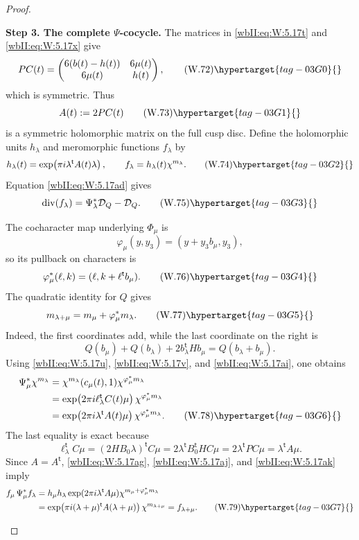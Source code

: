 \begin{proof}
\begin{enumerate}[label={$\langle1\rangle$\arabic*.},leftmargin=*]
\noindent\textbf{Step 3. The complete \(\Psi\)-cocycle.}
The matrices in \eqref{wbII:eq:W:5.17t} and \eqref{wbII:eq:W:5.17x} give
\[
 PC(t)=
 \begin{pmatrix}
 6(b(t)-h(t))&6\mu(t)\\
 6\mu(t)&h(t)
 \end{pmatrix},
\tag{W.72}\hypertarget{tag-03G0}{}\label{wbII:eq:W:5.17ae}
\]
which is symmetric.  Thus
\[
 A(t):=2PC(t)
\tag{W.73}\hypertarget{tag-03G1}{}\label{wbII:eq:W:5.17af}
\]
is a symmetric holomorphic matrix on the full cusp disc.  Define the
holomorphic units \(h_\lambda\) and meromorphic functions \(f_\lambda\) by
\[
 h_\lambda(t)=
 \exp\!\left(\pi i\lambda^{\mathsf t}A(t)\lambda\right),
 \qquad
 f_\lambda=h_\lambda(t)\chi^{m_\lambda}.
\tag{W.74}\hypertarget{tag-03G2}{}\label{wbII:eq:W:5.17ag}
\]
Equation \eqref{wbII:eq:W:5.17ad} gives
\[
 \operatorname{div}(f_\lambda)
 =\Psi_\lambda^*\mathcal D_Q-\mathcal D_Q.
\tag{W.75}\hypertarget{tag-03G3}{}\label{wbII:eq:W:5.17ah}
\]

The cocharacter map underlying \(\Phi_\mu\) is
\[
 \varphi_\mu(y,y_3)=(y+y_3b_\mu,y_3),
\]
so its pullback on characters is
\[
 \varphi_\mu^*(\ell,k)
 =(\ell,k+\ell^{\mathsf t}b_\mu).
\tag{W.76}\hypertarget{tag-03G4}{}\label{wbII:eq:W:5.17ai}
\]
The quadratic identity for \(Q\) gives
\[
 m_{\lambda+\mu}=m_\mu+\varphi_\mu^*m_\lambda.
\tag{W.77}\hypertarget{tag-03G5}{}\label{wbII:eq:W:5.17aj}
\]
Indeed, the first coordinates add, while the last coordinate on the
right is
\[
 Q(b_\mu)+Q(b_\lambda)+2b_\lambda^{\mathsf t}Hb_\mu
 =Q(b_\lambda+b_\mu).
\]
Using \eqref{wbII:eq:W:5.17u}, \eqref{wbII:eq:W:5.17v}, and \eqref{wbII:eq:W:5.17ai}, one obtains
\begin{align*}
 \Psi_\mu^*\chi^{m_\lambda}
 &=\chi^{m_\lambda}(c_\mu(t),1)
   \chi^{\varphi_\mu^*m_\lambda}\\
 &=\exp\!\left(2\pi i\ell_\lambda^{\mathsf t}C(t)\mu\right)
   \chi^{\varphi_\mu^*m_\lambda}\\
 &=\exp\!\left(2\pi i\lambda^{\mathsf t}A(t)\mu\right)
   \chi^{\varphi_\mu^*m_\lambda}.
\tag{W.78}\hypertarget{tag-03G6}{}\label{wbII:eq:W:5.17ak}
\end{align*}
The last equality is exact because
\[
 \ell_\lambda^{\mathsf t}C\mu
 =(2HB_0\lambda)^{\mathsf t}C\mu
 =2\lambda^{\mathsf t}B_0^{\mathsf t}HC\mu
 =2\lambda^{\mathsf t}PC\mu
 =\lambda^{\mathsf t}A\mu.
\]
Since \(A=A^{\mathsf t}\), \eqref{wbII:eq:W:5.17ag}, \eqref{wbII:eq:W:5.17aj}, and \eqref{wbII:eq:W:5.17ak} imply
\begin{align*}
 f_\mu\,\Psi_\mu^*f_\lambda
 &=h_\mu h_\lambda
   \exp(2\pi i\lambda^{\mathsf t}A\mu)
   \chi^{m_\mu+\varphi_\mu^*m_\lambda}\\
 &=\exp\!\left(
   \pi i(\lambda+\mu)^{\mathsf t}A(\lambda+\mu)\right)
   \chi^{m_{\lambda+\mu}}
 =f_{\lambda+\mu}.
\tag{W.79}\hypertarget{tag-03G7}{}\label{wbII:eq:W:5.17al}
\end{align*}


\end{enumerate}
\end{proof}

